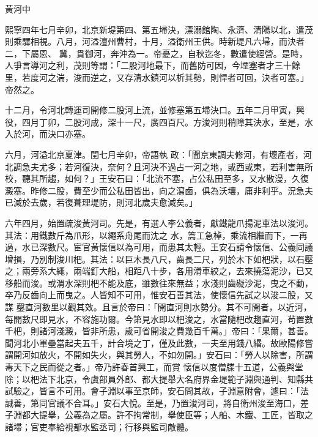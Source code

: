 
\begin{pinyinscope}

 黃河中



 熙寧四年七月辛卯，北京新堤第四、第五埽決，漂溺館陶、永濟、清陽以北，遣茂則乘驛相視。八月，河溢澶州曹村，十月，溢衛州王供。時新堤凡六埽，而決者二，下屬恩、
 冀，貫御河，奔沖為一。帝憂之，自秋迄冬，數遣使經營。是時，人爭言導河之利，茂則等謂：「二股河地最下，而舊防可因，今堙塞者才三十餘里，若度河之湍，浚而逆之，又存清水鎮河以析其勢，則悍者可回，決者可塞。」帝然之。



 十二月，令河北轉運司開修二股河上流，並修塞第五埽決口。五年二月甲寅，興役，四月丁卯，二股河成，深十一尺，廣四百尺。方浚河則稍障其決水，至是，水入於河，而決口亦塞。



 六月，河溢北京夏津。閏七月辛卯，帝語執
 政：「聞京東調夫修河，有壞產者，河北調急夫尤多；若河復決，奈何？且河決不過占一河之地，或西或東，若利害無所校，聽其所趨，如何？」王安石曰：「北流不塞，占公私田至多，又水散漫，久復澱塞。昨修二股，費至少而公私田皆出，向之瀉鹵，俱為沃壤，庸非利乎。況急夫已減於去歲，若復葺理堤防，則河北歲夫愈減矣。」



 六年四月，始置疏浚黃河司。先是，有選人李公義者，獻鐵龍爪揚泥車法以浚河。其法：用鐵數斤為爪形，以繩系舟尾而沈之
 水，篙工急棹，乘流相繼而下，一再過，水已深數尺。宦官黃懷信以為可用，而患其太輕。王安石請令懷信、公義同議增損，乃別制浚川杷。其法：以巨木長八尺，齒長二尺，列於木下如杷狀，以石壓之；兩旁系大繩，兩端釘大船，相距八十步，各用滑車絞之，去來撓蕩泥沙，已又移船而浚。或渭水深則杷不能及底，雖數往來無益；水淺則齒礙沙泥，曳之不動，卒乃反齒向上而曳之。人皆知不可用，惟安石善其法，使懷信先試之以浚二股，又謀
 鑿直河數里以觀其效。且言於帝曰：「開直河則水勢分。其不可開者，以近河，每開數尺即見水，不容施功爾。今第見水即以杷浚之，水當隨杷改趨直河，茍置數千杷，則諸河淺澱，皆非所患，歲可省開浚之費幾百千萬。」帝曰：「果爾，甚善。聞河北小軍壘當起夫五千，計合境之丁，僅及此數，一夫至用錢八緡。故歐陽修嘗謂開河如放火，不開如失火，與其勞人，不如勿開。」安石曰：「勞人以除害，所謂毒天下之民而從之者。」帝乃許春首興工，而賞
 懷信以度僧牒十五道，公義與堂除；以杷法下北京，令虞部員外郎、都大提舉大名府界金堤範子淵與通判、知縣共試驗之，皆言不可用。會子淵以事至京師，安石問其故，子淵意附會，遽曰：「法誠善，第同官議不合耳。」安石大悅。至是，乃置浚河司，將自衛州浚至海口，差子淵都大提舉，公義為之屬。許不拘常制，舉使臣等；人船、木鐵、工匠，皆取之諸埽；官吏奉給視都水監丞司；行移與監司敵體。




\end{pinyinscope}
